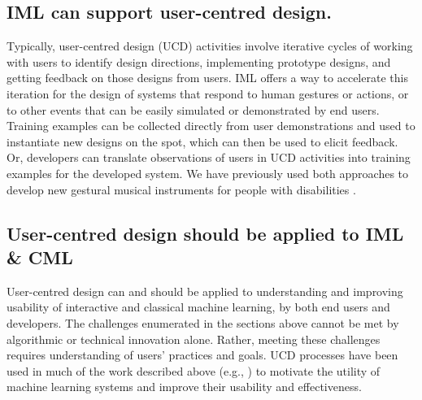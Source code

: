 \documentclass[letterpaper]{article}
\begin{document}
\subsection{IML can support user-centred design.} 
Typically, user-centred design (UCD) activities involve iterative cycles of  working with users to identify design directions, implementing prototype designs, and getting feedback on those designs from users. IML offers a way to accelerate this iteration for the design of systems that respond to human gestures or actions, or to other events that can be easily simulated or demonstrated by end users. Training examples can be collected directly from user demonstrations and used to instantiate new designs on the spot, which can then be used to elicit feedback. Or, developers can translate observations of users in UCD activities into training examples for the developed system. We have previously used both approaches to develop new gestural musical instruments for people with disabilities \cite{katan2015using}.



\subsection{User-centred design should be applied to IML \& CML} 
User-centred design can and should be applied to understanding and improving usability of interactive and classical machine learning, by both end users and developers. The challenges enumerated in the sections above cannot be met by algorithmic or technical innovation alone. Rather, meeting these challenges requires understanding of users' practices and goals. UCD processes have been used in much of the work described above (e.g., \cite{fiebrink2010toward,patel2010gestalt,amershi2014power}) to motivate the utility of machine learning systems and improve their usability and effectiveness. 
\end{document}
